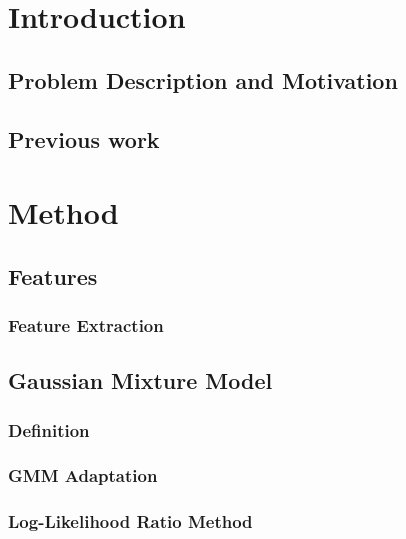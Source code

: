 \documentclass[11pt,a4paper]{tesis}
\begin{document}
\linespread{1.6}
\tableofcontents
\chapter{Introduction}
	\section{Problem Description and Motivation}
	\section{Previous work}
		
\chapter{Method}
	
	\section{Features}
		\subsection{Feature Extraction}
		
	\section{Gaussian Mixture Model}
		\subsection{Definition}
		\subsection{GMM Adaptation}
		\subsection{Log-Likelihood Ratio Method}
\end{document}
